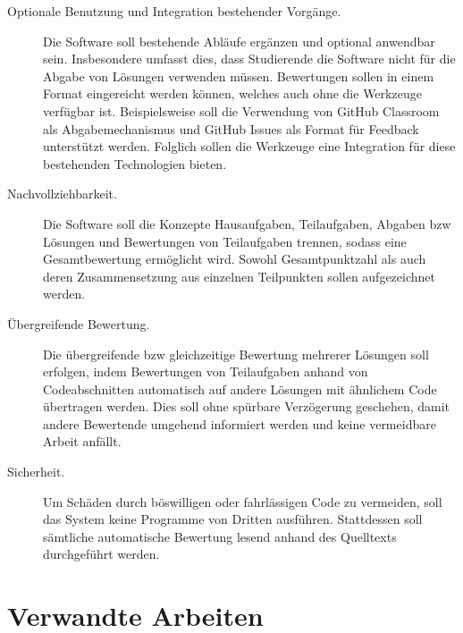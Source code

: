 \begin{description}
    \item[Optionale Benutzung und Integration bestehender Vorgänge.]
    Die Software soll bestehende Abläufe ergänzen und optional anwendbar sein.
    Insbesondere umfasst dies, dass Studierende die Software nicht für die Abgabe von Lösungen verwenden müssen.
    Bewertungen sollen in einem Format eingereicht werden können, welches auch ohne die Werkzeuge verfügbar ist.
    Beispielsweise soll die Verwendung von GitHub Classroom als Abgabemechanismus und GitHub Issues als Format für Feedback unterstützt werden.
    Folglich sollen die Werkzeuge eine Integration für diese bestehenden Technologien bieten.
    \item[Nachvollziehbarkeit.]
    Die Software soll die Konzepte Hausaufgaben, Teilaufgaben, Abgaben \ac{bzw} Lösungen und Bewertungen von Teilaufgaben trennen, sodass eine Gesamtbewertung ermöglicht wird.
    Sowohl Gesamtpunktzahl als auch deren Zusammensetzung aus einzelnen Teilpunkten sollen aufgezeichnet werden.
    \item[Übergreifende Bewertung.]
    Die übergreifende \ac{bzw} gleichzeitige Bewertung mehrerer Lösungen soll erfolgen, indem Bewertungen von Teilaufgaben anhand von Codeabschnitten automatisch auf andere Lösungen mit ähnlichem Code übertragen werden.
    Dies soll ohne spürbare Verzögerung geschehen, damit andere Bewertende umgehend informiert werden und keine vermeidbare Arbeit anfällt.
    \item[Sicherheit.]
    Um Schäden durch böswilligen oder fahrlässigen Code zu vermeiden, soll das System keine Programme von Dritten ausführen.
    Stattdessen soll sämtliche automatische Bewertung lesend anhand des Quelltexts durchgeführt werden.
\end{description}

\section{Verwandte Arbeiten}\label{sec:related-work}

